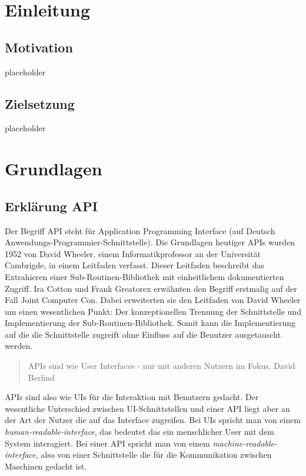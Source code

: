 \documentclass[bachelor, german ]{hgbthesis}
\begin{document}
\tableofcontents
\chapter{Einleitung}

\section{Motivation}
placeholder
\pagebreak

\section{Zielsetzung}
placeholder
\pagebreak

\chapter{Grundlagen}
\section{Erklärung API}

Der Begriff API steht für Application Programming Interface (auf Deutsch Anwendungs-Programmier-Schnittstelle).
Die Grundlagen heutiger APIs wurden 1952 von David Wheeler, einem Informatikprofessor an der Universität Cambrigde, in einem Leitfaden verfasst.
Dieser Leitfaden beschreibt das Extrahieren einer Sub-Routinen-Bibliothek mit einheitlichem dokumentierten Zugriff. \cite{wheeler1952use}
Ira Cotton und Frank Greatorex erwähnten den Begriff erstmalig auf der Fall Joint Computer Con.\cite{cotton1968data}
Dabei erweiterten sie den Leitfaden von David Wheeler um einen wesentlichen Punkt: Der konzeptionellen Trennung der Schnittstelle und Implementierung der Sub-Routinen-Bibliothek.
Somit kann die Implementierung auf die die Schnittstelle zugreift ohne Einfluss auf die Benutzer ausgetauscht werden.\cite{kress2020graphql}

\begin{quote}
APIs sind wie User Interfaces - nur mit anderen Nutzern im Fokus. David Berlind \cite{berlind2017apis}
\end{quote}

APIs sind also wie UIs für die Interaktion mit Benutzern gedacht.
Der wesentliche Unterschied zwischen UI-Schnittstellen und einer API liegt aber an der Art der Nutzer die auf das Interface zugreifen.
Bei UIs spricht man von einem \textit{human-readable-interface}, das bedeutet das ein menschlicher User mit dem System interagiert.
Bei einer API spricht man von einem \textit{machine-readable-interface}, also von einer Schnittstelle die für die Kommunikation zwischen Maschinen gedacht ist.
\end{document}

